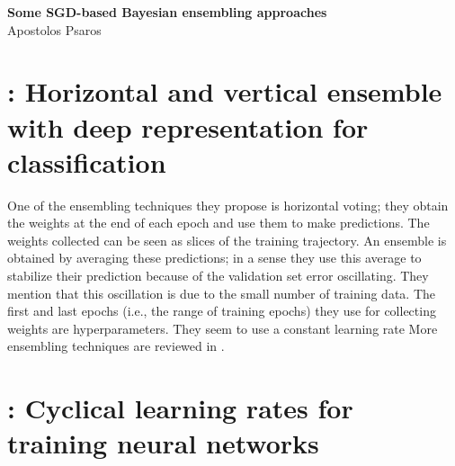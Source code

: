 

\newcommand{\bw}{\boldsymbol{w}}
\newcommand{\bp}{\boldsymbol{p}}
\newcommand{\bth}{\boldsymbol{\theta}}
\newcommand{\bA}{\boldsymbol{A}}
\newcommand{\cH}{\pazocal{H}}
\newcommand{\cN}{\pazocal{N}}
\newcommand{\cP}{\pazocal{P}}
\newcommand{\cD}{\pazocal{D}}
\newcommand{\cO}{\pazocal{O}}
\newcommand{\cL}{\pazocal{L}}


\setcounter{tocdepth}{3}

	
	\sloppy
	
	\begin{center}	
		\Large
		\textbf{Some SGD-based Bayesian ensembling approaches}\\
		\large
		Apostolos Psaros\\	
	\end{center}
	\vskip 0.25in
	



\section{\textcite{xie2013horizontal}: Horizontal and vertical ensemble with deep representation for classification}
One of the ensembling techniques they propose is horizontal voting; they obtain the weights at the end of each epoch and use them to make predictions. 
The weights collected can be seen as slices of the training trajectory.
An ensemble is obtained by averaging these predictions; in a sense they use this average to stabilize their prediction because of the validation set error oscillating.
They mention that this oscillation is due to the small number of training data.
The first and last epochs (i.e., the range of training epochs) they use for collecting weights are hyperparameters.
They seem to use a constant learning rate
More ensembling techniques are reviewed in \textcite{huang2017snapshot}.

\section{\textcite{smith2017cyclical}: Cyclical learning rates for training neural networks}

